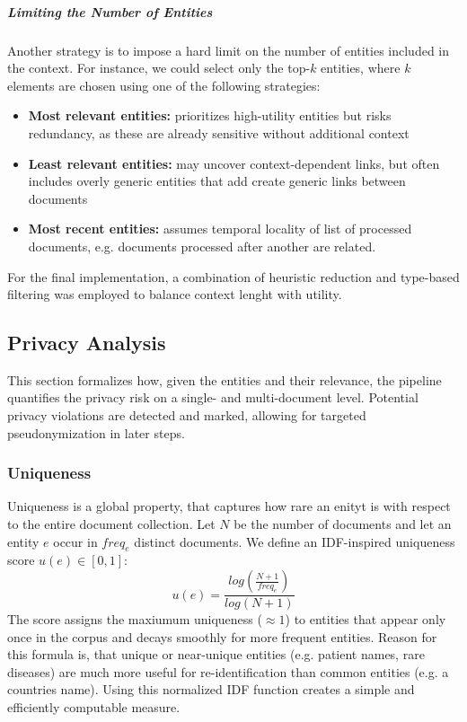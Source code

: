 \subparagraph{Limiting the Number of Entities}
Another strategy is to impose a hard limit on the number of entities included in the context. For instance, we could select only the top-$k$ entities, where $k$ elements are chosen using one of the following strategies:
\begin{itemize}
    \item \textbf{Most relevant entities:} prioritizes high-utility entities but risks redundancy, as these are already sensitive without additional context
    \item \textbf{Least relevant entities:} may uncover context-dependent links, but often includes overly generic entities that add create generic links between documents
    \item \textbf{Most recent entities:} assumes temporal locality of list of processed documents, e.g. documents processed after another are related. %
\end{itemize}

For the final implementation, a combination of heuristic reduction and type-based filtering was employed to balance context lenght with utility.

\subsection{Privacy Analysis}
This section formalizes how, given the entities and their relevance, the pipeline quantifies the privacy risk on a single- and multi-document level. Potential privacy violations are detected and marked, allowing for targeted pseudonymization in later steps. 

\subsubsection{Uniqueness}\label{subsubsec:uniqueness}
Uniqueness is a global property, that captures how rare an enityt is with respect to the entire document collection. Let $N$ be the number of documents and let an entity $e$ occur in $freq_e$ distinct documents. We define an IDF-inspired uniqueness score $u(e)\in[0,1]$:
\[u(e) = \frac{log(\frac{N+1}{freq_e})}{log(N+1)}\]
The score assigns the maxiumum uniqueness ($\approx 1$) to entities that appear only once in the corpus and decays smoothly for more frequent entities. Reason for this formula is, that unique or near-unique entities (e.g. patient names, rare diseases) are much more useful for re-identification than common entities (e.g. a countries name). Using this normalized IDF function creates a simple and efficiently computable measure.

